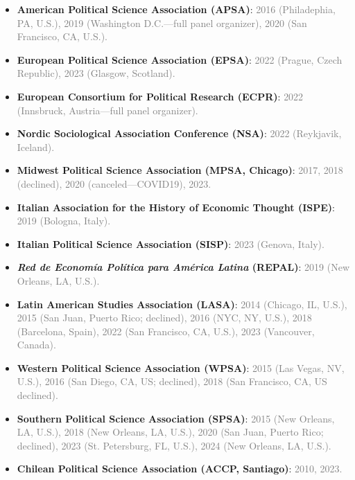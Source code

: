 \begin{itemize}
\item[\textcolor{gray}{\textbullet}] {\bf American Political Science Association (APSA)}: \textcolor{gray}{2016 (Philadephia, PA, U.S.), 2019 (Washington D.C.---full panel organizer), 2020 (San Francisco, CA, U.S.).}
\item[\textcolor{gray}{\textbullet}] {\bf European Political Science Association (EPSA)}: \textcolor{gray}{2022 (Prague, Czech Republic), 2023 (Glasgow, Scotland).}
\item[\textcolor{gray}{\textbullet}] {\bf European Consortium for Political Research (ECPR)}: \textcolor{gray}{2022 (Innsbruck, Austria---full panel organizer).}
\item[\textcolor{gray}{\textbullet}] {\bf Nordic Sociological Association Conference (NSA)}: \textcolor{gray}{2022 (Reykjavik, Iceland).}
\item[\textcolor{gray}{\textbullet}] {\bf Midwest Political Science Association (MPSA, Chicago)}: \textcolor{gray}{2017, 2018 (declined), 2020 (canceled---COVID19), 2023.}
\item[\textcolor{gray}{\textbullet}] {\bf Italian Association for the History of Economic Thought (ISPE)}: \textcolor{gray}{2019 (Bologna, Italy).}
\item[\textcolor{gray}{\textbullet}] {\bf Italian Political Science Association (SISP)}: \textcolor{gray}{2023 (Genova, Italy).}
\item[\textcolor{gray}{\textbullet}] {\bf \emph{Red de Econom\'ia Pol\'itica para Am\'erica Latina} (REPAL)}: \textcolor{gray}{2019 (New Orleans, LA, U.S.).}
\item[\textcolor{gray}{\textbullet}] {\bf Latin American Studies Association (LASA)}: \textcolor{gray}{2014 (Chicago, IL, U.S.), 2015 (San Juan, Puerto Rico; declined), 2016 (NYC, NY, U.S.), 2018 (Barcelona, Spain), 2022 (San Francisco, CA, U.S.), 2023 (Vancouver, Canada).}
\item[\textcolor{gray}{\textbullet}] {\bf Western Political Science Association (WPSA)}: \textcolor{gray}{2015 (Las Vegas, NV, U.S.), 2016 (San Diego, CA, US; declined), 2018 (San Francisco, CA, US declined).}
\item[\textcolor{gray}{\textbullet}] {\bf Southern Political Science Association (SPSA)}: \textcolor{gray}{2015 (New Orleans, LA, U.S.), 2018 (New Orleans, LA, U.S.), 2020 (San Juan, Puerto Rico; declined), 2023 (St. Petersburg, FL, U.S.), 2024 (New Orleans, LA, U.S.).}
\item[\textcolor{gray}{\textbullet}] {\bf Chilean Political Science Association (ACCP, Santiago)}: \textcolor{gray}{2010, 2023.}


\end{itemize}
